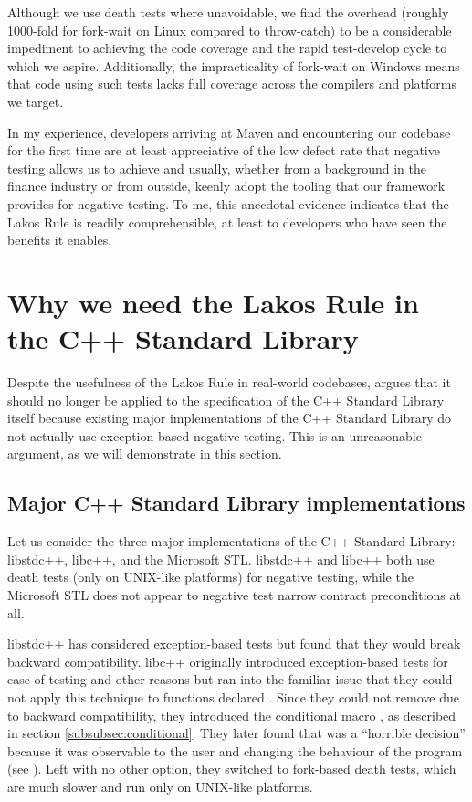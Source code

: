 Although we use death tests where unavoidable, we find the overhead (roughly 1000-fold for fork-wait on Linux compared to throw-catch) to be a considerable impediment to achieving the code coverage and the rapid test-develop cycle to which we aspire. Additionally, the impracticality of fork-wait on Windows means that code using such tests lacks full coverage across the compilers and platforms we target.

In my experience, developers arriving at Maven and encountering our codebase for the first time are at least appreciative of the low defect rate that negative testing allows us to achieve and usually, whether from a background in the finance industry or from outside, keenly adopt the tooling that our framework provides for negative testing. To me, this anecdotal evidence indicates that the Lakos Rule is readily comprehensible, at least to developers who have seen the benefits it enables.

\section{Why we need the Lakos Rule in the C++ Standard Library}
\label{sec:stdlib}

Despite the usefulness of the Lakos Rule in real-world codebases, \cite{P1656R2} argues that it should no longer be applied to the specification of the C++ Standard Library itself because existing major implementations of the C++ Standard Library do not actually use exception-based negative testing. This is an unreasonable argument, as we will demonstrate in this section.

\subsection{Major C++ Standard Library implementations}
\label{subsec:major}

Let us consider the three major implementations of the C++ Standard Library: libstdc++, libc++, and the Microsoft STL. libstdc++ and libc++ both use death tests (only on UNIX-like platforms) for negative testing, while the Microsoft STL does not appear to negative test narrow contract preconditions at all.

libstdc++ has considered exception-based tests but found that they would break backward compatibility. libc++ originally introduced exception-based tests for ease of testing and other reasons but ran into the familiar issue that they could not apply this technique to functions declared . Since they could not remove  due to backward compatibility, they introduced the conditional  macro  , as described in section \ref{subsubsec:conditional}. They later found that  was a ``horrible decision'' because  it was observable to the user and changing the behaviour of the program (see \cite{LLVMReviewD59166}). Left with no other option, they switched to fork-based death tests, which are much slower and run only on UNIX-like platforms.

